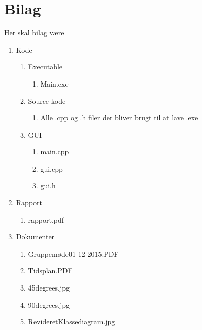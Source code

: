 \appendix
\section{Bilag} \hfill
Her skal bilag være
\label{sec:bilag}
\begin{enumerate}[noitemsep]
	\item Kode
	\begin{enumerate}[noitemsep]
		\item Executable
		\begin{enumerate}[noitemsep]
			\item Main.exe
		\end{enumerate}
		\item Source kode
		\begin{enumerate}[noitemsep]
			\item Alle .cpp og .h filer der bliver brugt til at lave .exe
		\end{enumerate}
		\item GUI
		\begin{enumerate}[noitemsep]
			\item main.cpp
			\item gui.cpp
			\item gui.h
		\end{enumerate}
	\end{enumerate}
	\item Rapport
	\begin{enumerate}[noitemsep]
		\item rapport.pdf
	\end{enumerate}
	\item Dokumenter
	\begin{enumerate}[noitemsep]
		\item Gruppemøde01-12-2015.PDF \label{itm:Modereferat1}
		\item Tidsplan.PDF \label{itm:Tidsplan1}
		\item 45degrees.jpg \label{itm:45deg}
		\item 90degrees.jpg \label{itm:90deg}
		\item RevideretKlassediagram.jpg \label{itm:Klassediagramv3}
	\end{enumerate}
\end{enumerate}